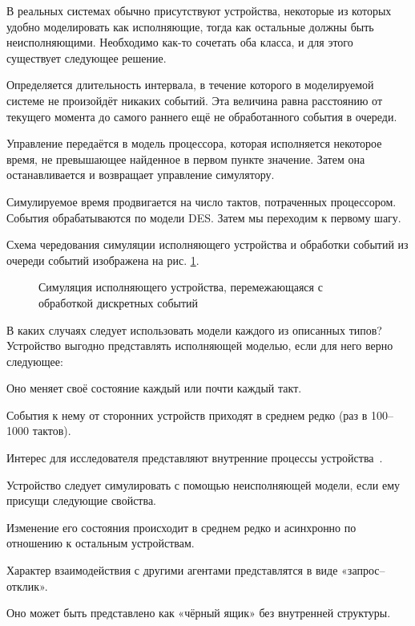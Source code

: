 В реальных системах обычно присутствуют устройства, некоторые из которых удобно моделировать как исполняющие, тогда как остальные должны быть неисполняющими. Необходимо как-то сочетать оба класса, и для этого существует следующее решение.

\begin{enumerate*}
\item Определяется длительность интервала, в течение которого в моделируемой системе не произойдёт никаких событий. Эта величина равна расстоянию от текущего момента до самого раннего ещё не обработанного события в очереди.

\item Управление передаётся в модель процессора, которая исполняется  некоторое время, не превышающее найденное в первом пункте значение. Затем она останавливается и возвращает управление симулятору.

\item Симулируемое время продвигается на число тактов, потраченных процессором. События обрабатываются по модели DES. Затем мы переходим к первому шагу.
\end{enumerate*}

Схема чередования симуляции исполняющего устройства и обработки событий из очереди событий изображена на рис. \ref{fig:queue2}.

\begin{figure}[htb]
    \centering
    \caption{Симуляция исполняющего устройства, перемежающаяся с обработкой дискретных событий}
    \label{fig:queue2}
\end{figure}

В каких случаях следует использовать модели каждого из описанных типов? Устройство выгодно представлять исполняющей моделью, если для него верно следующее:
\begin{enumerate*}
    \item Оно меняет своё состояние каждый или почти каждый такт.
    \item События к нему от сторонних устройств приходят в среднем редко (раз в 100–1000 тактов).
    \item Интерес для исследователя представляют внутренние процессы устройства~\citep{fritzson2004principles}.
\end{enumerate*}

Устройство следует симулировать с помощью неисполняющей модели, если ему присущи следующие свойства.
\begin{enumerate*}
    \item Изменение его состояния происходит в среднем редко и асинхронно по отношению к остальным устройствам.
    \item Характер взаимодействия с другими агентами представлятся в виде «запрос–отклик».
    \item Оно может быть представлено как «чёрный ящик» без внутренней структуры.
\end{enumerate*}


